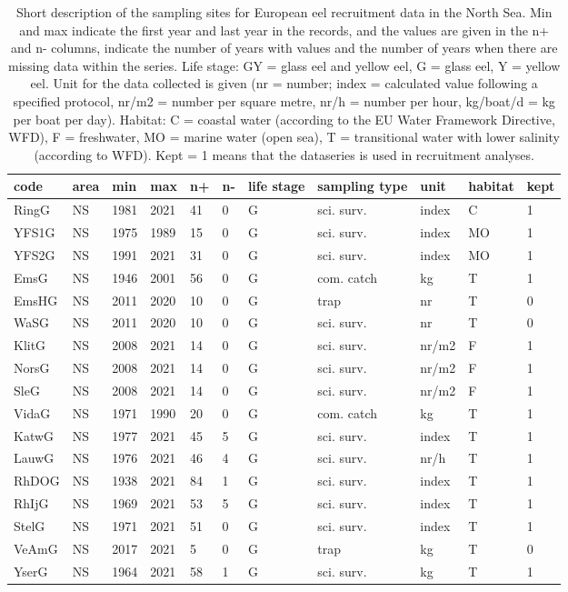 \begin{table}[ht]
\centering
\caption{Short description of the sampling sites for European eel recruitment data in the North Sea. Min and max indicate the first year and last year in the records, and the values are given in the n+ and n- columns, indicate the number of years with values and the number of years when there are missing data within the series. Life stage: GY = glass eel and yellow eel, G = glass eel, Y = yellow eel. Unit for the data collected is given (nr = number; index = calculated value following a specified protocol, nr/m2 = number per square metre, nr/h = number per hour, kg/boat/d = kg per boat per day). Habitat: C = coastal water (according to the EU Water Framework Directive, WFD), F = freshwater, MO = marine water (open sea), T = transitional water with lower salinity (according to WFD). Kept = 1 means that the dataseries is used in recruitment analyses.} 
\label{statseriesG}
\begin{tabular}{p{1cm}p{1cm}p{1cm}p{1cm}p{0.8cm}p{0.8cm}p{1cm}p{2cm}p{2cm}p{1cm}p{1cm}}
  \hline
code & area & min & max & n+ & n- & life stage & sampling type & unit & habitat & kept \\ 
  \hline
RingG & NS & 1981 & 2021 & 41 & 0 & G & sci. surv. & index & C & 1 \\ 
  YFS1G & NS & 1975 & 1989 & 15 & 0 & G & sci. surv. & index & MO & 1 \\ 
  YFS2G & NS & 1991 & 2021 & 31 & 0 & G & sci. surv. & index & MO & 1 \\ 
  EmsG & NS & 1946 & 2001 & 56 & 0 & G & com. catch & kg & T & 1 \\ 
  EmsHG & NS & 2011 & 2020 & 10 & 0 & G & trap & nr & T & 0 \\ 
  WaSG & NS & 2011 & 2020 & 10 & 0 & G & sci. surv. & nr & T & 0 \\ 
  KlitG & NS & 2008 & 2021 & 14 & 0 & G & sci. surv. & nr/m2 & F & 1 \\ 
  NorsG & NS & 2008 & 2021 & 14 & 0 & G & sci. surv. & nr/m2 & F & 1 \\ 
  SleG & NS & 2008 & 2021 & 14 & 0 & G & sci. surv. & nr/m2 & F & 1 \\ 
  VidaG & NS & 1971 & 1990 & 20 & 0 & G & com. catch & kg & T & 1 \\ 
  KatwG & NS & 1977 & 2021 & 45 & 5 & G & sci. surv. & index & T & 1 \\ 
  LauwG & NS & 1976 & 2021 & 46 & 4 & G & sci. surv. & nr/h & T & 1 \\ 
  RhDOG & NS & 1938 & 2021 & 84 & 1 & G & sci. surv. & index & T & 1 \\ 
  RhIjG & NS & 1969 & 2021 & 53 & 5 & G & sci. surv. & index & T & 1 \\ 
  StelG & NS & 1971 & 2021 & 51 & 0 & G & sci. surv. & index & T & 1 \\ 
  VeAmG & NS & 2017 & 2021 & 5 & 0 & G & trap & kg & T & 0 \\ 
  YserG & NS & 1964 & 2021 & 58 & 1 & G & sci. surv. & kg & T & 1 \\ 
   \hline
\end{tabular}
\end{table}
